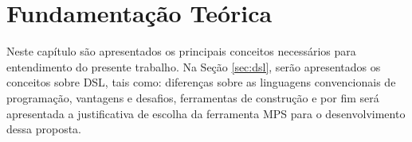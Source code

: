 \chapter{Fundamentação Teórica}
\label{chap:fundamentacao}

Neste capítulo são apresentados os principais conceitos necessários para entendimento do presente trabalho. Na Seção \ref{sec:dsl}, serão apresentados os conceitos sobre \gls{DSL}, tais como: diferenças sobre as linguagens convencionais de programação, vantagens e desafios, ferramentas de construção e por fim será apresentada a justificativa de escolha da ferramenta \gls{MPS} para o desenvolvimento dessa proposta.






